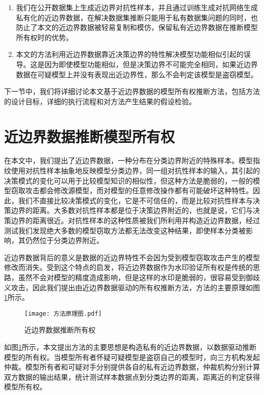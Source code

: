 \begin{enumerate}
	\renewcommand{\labelenumi}{\theenumi)}
	\item 我们在公开数据集上生成近边界对抗性样本，并且通过训练生成对抗网络生成私有化的近边界数据，在解决数据集推断只能用于私有数据集问题的同时，也防止了本文的近边界数据被轻易复制和模仿，保留私有近边界数据在推断模型所有权时的优势。
	\item 本文的方法利用近边界数据靠近决策边界的特性解决模型功能相似引起的误导。这是因为即使模型功能相似，但是决策边界不可能完全相同，如果近边界数据在可疑模型上并没有表现出近边界性，那么不会判定该模型是盗窃模型。
\end{enumerate}

下一节中，我们将详细讨论本文基于近边界数据的模型所有权推断方法，包括方法的设计目标，详细的执行流程和对方法产生结果的假设检验。

\section{近边界数据推断模型所有权}\label{4.2}

在本文中，我们提出了近边界数据，一种分布在分类边界附近的特殊样本。模型指纹\cite{cao2021ipguard}使用对抗性样本抽象地反映模型分类边界，同一组对抗性样本的输入，其引起的决策模式的变化可以用于比较模型知识的相似性，但这种方法是脆弱的，一般的模型窃取攻击都会修改源模型，而对模型的任意修改操作都有可能破坏这种特性。因此，我们不直接比较决策模式的变化，它是不可信任的，而是比较对抗性样本与决策边界的距离。大多数对抗性样本都是位于决策边界附近的，也就是说，它们与决策边界的距离很近。对抗性样本的这种性质被我们所利用并构造近边界数据，经过测试我们发现绝大多数的模型窃取方法都无法改变这种结果，即使样本分类被影响，其仍然位于分类边界附近。

近边界数据背后的意义是数据的近边界特性不会因为受到模型窃取攻击产生的模型修改而消失。受到这个特点的启发，将近边界数据作为水印验证所有权是传统的思路，虽然不会对模型的精度造成影响，但是这样的水印是脆弱的，很容易受到御歧义攻击，因此我们提出由近边界数据驱动的所有权推断方法，方法的主要原理如图\ref{方法原理图}所示。

\begin{figure}[htbp]%
	\centering
	\texttt{[image: 方法原理图.pdf]}
	\setlength{\abovecaptionskip}{5mm} %
	\caption{近边界数据推断所有权}
	\label{方法原理图}
\end {figure}

如图\ref{方法原理图}所示，本文提出方法的主要思想是构造私有的近边界数据，以数据驱动推断模型的所有权。当模型所有者怀疑可疑模型是盗窃自己的模型时，向三方机构发起仲裁。模型所有者和可疑对手分别提供各自的私有近边界数据，仲裁机构分别计算双方数据的输出结果，统计测试样本数据点到分类边界的距离，距离近的判定获得模型所有权。


